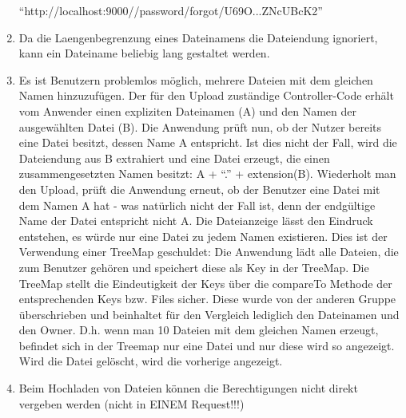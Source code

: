 \documentclass[12pt,DIV14,BCOR10mm,a4paper,parskip=half-,headsepline,headinclude,english,ngerman,bibliography=totocnumbered]{scrreprt}
\begin{document}
\begin{enumerate}
  \enquote{http://localhost:9000//password/forgot/U69O...ZNcUBcK2}
  \item Da die Laengenbegrenzung eines Dateinamens die Dateiendung ignoriert, kann ein Dateiname beliebig lang gestaltet werden.
  \item Es ist Benutzern problemlos möglich, mehrere Dateien mit dem gleichen Namen hinzuzufügen. Der für den Upload zuständige Controller-Code erhält vom Anwender einen expliziten Dateinamen (A) und den Namen der ausgewählten Datei (B). Die Anwendung prüft nun, ob der Nutzer bereits eine Datei besitzt, dessen Name A entspricht. Ist dies nicht der Fall, wird die Dateiendung aus B extrahiert und eine Datei erzeugt, die einen zusammengesetzten Namen besitzt: A + \enquote{.} + extension(B).
  Wiederholt man den Upload, prüft die Anwendung erneut, ob der Benutzer eine Datei mit dem Namen A hat - was natürlich nicht der Fall ist, denn der endgültige Name der Datei entspricht nicht A.
  Die Dateianzeige lässt den Eindruck entstehen, es würde nur eine Datei zu jedem Namen existieren. Dies ist der Verwendung einer TreeMap geschuldet: Die Anwendung lädt alle Dateien, die zum Benutzer gehören und speichert diese als Key in der TreeMap. Die TreeMap stellt die Eindeutigkeit der Keys über die compareTo Methode der entsprechenden Keys bzw. Files sicher. Diese wurde von der anderen Gruppe überschrieben und beinhaltet für den Vergleich lediglich den Dateinamen und den Owner. D.h. wenn man 10 Dateien mit dem gleichen Namen erzeugt, befindet sich in der Treemap nur eine Datei und nur diese wird so angezeigt. Wird die Datei gelöscht, wird die vorherige angezeigt.
  \item Beim Hochladen von Dateien können die Berechtigungen nicht direkt vergeben werden (nicht in EINEM Request!!!)
  \end{enumerate}
\end{document}
